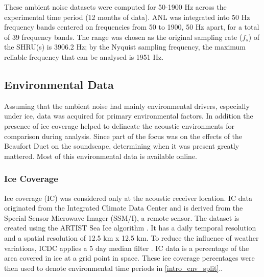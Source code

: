 
These ambient noise datasets were computed for 50-1900 Hz across the experimental time period (12 months of data). ANL was integrated into 50 Hz frequency bands centered on frequencies from 50 to 1900, 50 Hz apart, for a total of 39 frequency bands. The range was chosen as the original sampling rate ($f_{s}$) of the SHRU(s) is  3906.2 Hz; by the Nyquist sampling frequency, the maximum reliable frequency that can be analysed is 1951 Hz.

\subsection{Environmental Data} \label{intro_env_info}

Assuming that the ambient noise had mainly environmental drivers, especially under ice, data was acquired for primary environmental factors. In addition the presence of ice coverage helped to delineate the acoustic environments for comparison during analysis. Since part of the focus was on the effects of the Beaufort Duct on the soundscape, determining when it was present greatly mattered. Most of this environmental data is available online.

\subsubsection{Ice Coverage} \label{intro_env_ice_cov}

Ice coverage (IC) was considered only at the acoustic receiver location. IC data originated from the Integrated Climate Data Center \parencite{kaleschke2001ssm} and is derived from the Special Sensor Microwave Imager (SSM/I), a remote sensor. The dataset is created using the ARTIST Sea Ice algorithm \parencite{spreen2008sea}. It has a daily temporal resolution and a spatial resolution of 12.5 km x 12.5 km. To reduce the influence of weather variations, ICDC applies a 5 day median filter \parencite{kern2010climatology}. IC data is a percentage of the area covered in ice at a grid point in space. These ice coverage percentages were then used to denote environmental time periods in \autoref{intro_env_split}..


